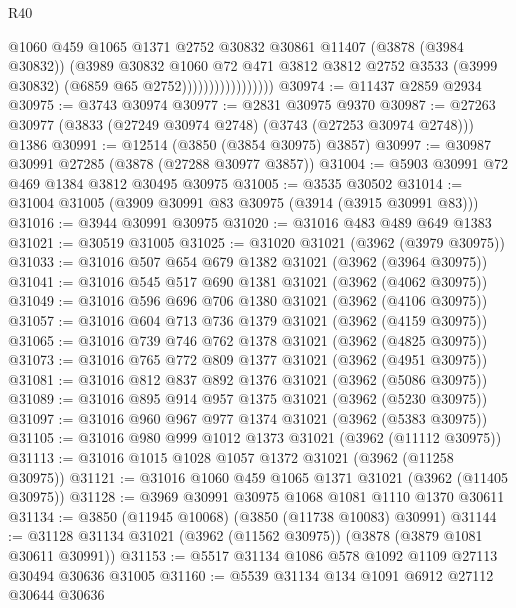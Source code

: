 \begin{lexlean}{R40}
\begin{coremodule}
                                  @1060
                                  @459
                                  @1065
                                  @1371
                                  @2752
                                  @30832
                                  @30861
                                  @11407
                                  (@3878 (@3984 @30832))
                                  (@3989
                                    @30832
                                    @1060
                                    @72
                                    @471
                                    @3812
                                    @3812
                                    @2752
                                    @3533
                                    (@3999 @30832)
                                    (@6859 @65 @2752)))))))))))))))))
@30974 := @11437 @2859 @2934
@30975 := @3743 @30974
@30977 := @2831 @30975 @9370
@30987 := @27263 @30977 (@3833 (@27249 @30974 @2748) (@3743 (@27253 @30974 @2748))) @1386
@30991 := @12514 (@3850 (@3854 @30975) @3857)
@30997 := @30987 @30991 @27285 (@3878 (@27288 @30977 @3857))
@31004 := @5903 @30991 @72 @469 @1384 @3812 @30495 @30975
@31005 := @3535 @30502
@31014 := @31004 @31005 (@3909 @30991 @83 @30975 (@3914 (@3915 @30991 @83)))
@31016 := @3944 @30991 @30975
@31020 := @31016 @483 @489 @649 @1383
@31021 := @30519 @31005
@31025 := @31020 @31021 (@3962 (@3979 @30975))
@31033 := @31016 @507 @654 @679 @1382 @31021 (@3962 (@3964 @30975))
@31041 := @31016 @545 @517 @690 @1381 @31021 (@3962 (@4062 @30975))
@31049 := @31016 @596 @696 @706 @1380 @31021 (@3962 (@4106 @30975))
@31057 := @31016 @604 @713 @736 @1379 @31021 (@3962 (@4159 @30975))
@31065 := @31016 @739 @746 @762 @1378 @31021 (@3962 (@4825 @30975))
@31073 := @31016 @765 @772 @809 @1377 @31021 (@3962 (@4951 @30975))
@31081 := @31016 @812 @837 @892 @1376 @31021 (@3962 (@5086 @30975))
@31089 := @31016 @895 @914 @957 @1375 @31021 (@3962 (@5230 @30975))
@31097 := @31016 @960 @967 @977 @1374 @31021 (@3962 (@5383 @30975))
@31105 := @31016 @980 @999 @1012 @1373 @31021 (@3962 (@11112 @30975))
@31113 := @31016 @1015 @1028 @1057 @1372 @31021 (@3962 (@11258 @30975))
@31121 := @31016 @1060 @459 @1065 @1371 @31021 (@3962 (@11405 @30975))
@31128 := @3969 @30991 @30975 @1068 @1081 @1110 @1370 @30611
@31134 := @3850 (@11945 @10068) (@3850 (@11738 @10083) @30991)
@31144 := @31128 @31134 @31021 (@3962 (@11562 @30975)) (@3878 (@3879 @1081 @30611 @30991))
@31153 := @5517 @31134 @1086 @578 @1092 @1109 @27113 @30494 @30636 @31005
@31160 := @5539 @31134 @134 @1091 @6912 @27112 @30644 @30636

\end{coremodule}
\end{lexlean}
